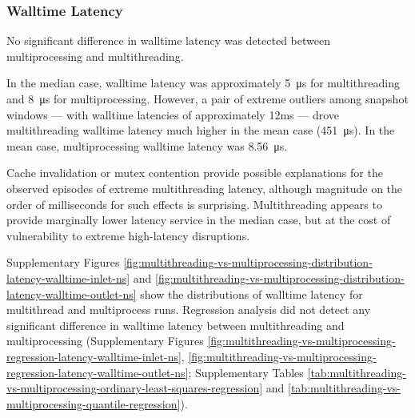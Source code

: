 \subsubsection{Walltime Latency}

No significant difference in walltime latency was detected between multiprocessing and multithreading.

In the median case, walltime latency was approximately \SI{5}{\micro\second} for multithreading and \SI{8}{\micro\second} for multiprocessing.
However, a pair of extreme outliers among snapshot windows --- with walltime latencies of approximately 12ms --- drove multithreading walltime latency much higher in the mean case (\SI{451}{\micro\second}).
In the mean case, multiprocessing walltime latency was \SI{8.56}{\micro\second}.

Cache invalidation or mutex contention provide possible explanations for the observed episodes of extreme multithreading latency, although magnitude on the order of milliseconds for such effects is surprising.
Multithreading appears to provide marginally lower latency service in the median case, but at the cost of vulnerability to extreme high-latency disruptions.

Supplementary Figures \ref{fig:multithreading-vs-multiprocessing-distribution-latency-walltime-inlet-ns} and \ref{fig:multithreading-vs-multiprocessing-distribution-latency-walltime-outlet-ns} show the distributions of walltime latency for multithread and multiprocess runs.
Regression analysis did not detect any significant difference in walltime latency between multithreading and multiprocessing (Supplementary Figures \ref{fig:multithreading-vs-multiprocessing-regression-latency-walltime-inlet-ns}, \ref{fig:multithreading-vs-multiprocessing-regression-latency-walltime-outlet-ns}; Supplementary Tables \ref{tab:multithreading-vs-multiprocessing-ordinary-least-squares-regression} and \ref{tab:multithreading-vs-multiprocessing-quantile-regression}).

